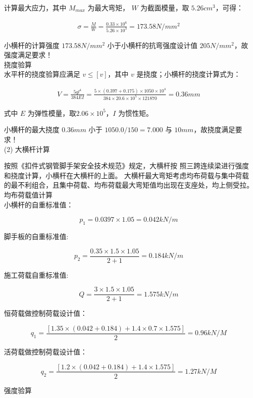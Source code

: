 计算最大应力，其中 $M_{max}$ 为最大弯矩， $W$ 为截面模量，取 $5.26 cm^3$，可得：

\begin{align}
    \label{fx:load}
    \sigma =\frac{M}{W}=\frac{0.33\times 10^6}{5.26\times10^3}=173.58N/mm^2
\end{align}

小横杆的计算强度 $173.58N/mm^2$ 小于小横杆的抗弯强度设计值 $205N/mm^2$，故强度满足要求！\\

 挠度验算\\

水平杆的挠度验算应满足 $v\leq [v] $，其中 $v$ 是挠度；小横杆的挠度计算式为：

\begin{align}
    V=\frac{5ql^4}{384EI}=\frac{5\times (0.397+0.175)\times 1050\times 10^4}{384\times 20.6\times 10^5\times 121870}=0.36 mm
\end{align}

式中 $E$ 为弹性模量，取$2.06\times 10^5$，$I$ 为惯性矩。

小横杆的最大挠度 $0.36mm$ 小于 $1050.0/150=7.000$ 与 $10mm$，故挠度满足要求！ \\

(2) 大横杆计算

按照《扣件式钢管脚手架安全技术规范》规定，大横杆按
照三跨连续梁进行强度和挠度计算，小横杆在大横杆的上面。
大横杆最大弯矩考虑均布荷载与集中荷载的最不利组合，且集中荷载、均布荷载最大弯矩值均出现在支座处，均上侧受拉。\\

 均布荷载值计算\\

小横杆的自重标准值：

$$p_1=0.0397 \times 1.05=0.042 kN/m$$

脚手板的自重标准值:

$$p_2=\frac{0.35 \times 1.5\times 1.05}{2+1}=0.184 kN/m$$

施工荷载自重标准值:

$$Q=\frac{3 \times 1.5\times 1.05}{2+1}=1.575 kN/m$$

恒荷载做控制荷载设计值：

$$q_1=\frac{[1.35\times(0.042+0.184)+1.4\times 0.7\times 1.575]}{2}=0.96 kN/M$$

活荷载做控制荷载设计值：

$$q_2=\frac{[1.2\times(0.042+0.184)+1.4\times 1.575]}{2}=1.27 kN/M$$

 强度验算\\

